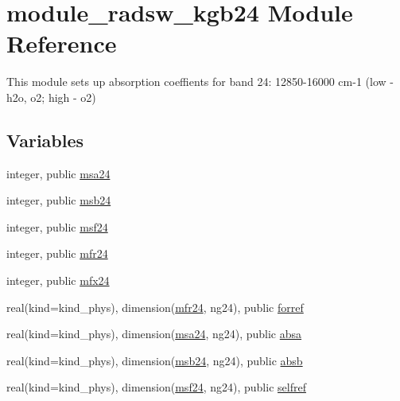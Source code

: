 \hypertarget{namespacemodule__radsw__kgb24}{}\section{module\+\_\+radsw\+\_\+kgb24 Module Reference}
\label{namespacemodule__radsw__kgb24}


This module sets up absorption coeffients for band 24\+: 12850-\/16000 cm-\/1 (low -\/ h2o, o2; high -\/ o2)  


\subsection*{Variables}
\begin{DoxyCompactItemize}
\item 
integer, public \hyperlink{namespacemodule__radsw__kgb24_ad416df05aed8a6ae1ecd57d5c90c223c}{msa24}
\item 
integer, public \hyperlink{namespacemodule__radsw__kgb24_a0ec09b4df9fbfa868844ad93a84cbe31}{msb24}
\item 
integer, public \hyperlink{namespacemodule__radsw__kgb24_a52d0fde0af1d5427acf0d1924f393cdc}{msf24}
\item 
integer, public \hyperlink{namespacemodule__radsw__kgb24_a3a1c3808493ce89f2218116a02350e51}{mfr24}
\item 
integer, public \hyperlink{namespacemodule__radsw__kgb24_a6fcafb0e1605ad49a252ed1e22b00a5b}{mfx24}
\item 
real(kind=kind\+\_\+phys), dimension(\hyperlink{namespacemodule__radsw__kgb24_a3a1c3808493ce89f2218116a02350e51}{mfr24}, ng24), public \hyperlink{namespacemodule__radsw__kgb24_ac57357ab300edcbad8f7b3801b796af3}{forref}
\item 
real(kind=kind\+\_\+phys), dimension(\hyperlink{namespacemodule__radsw__kgb24_ad416df05aed8a6ae1ecd57d5c90c223c}{msa24}, ng24), public \hyperlink{namespacemodule__radsw__kgb24_a06965ec156c4e1d18d50a70ba43bd8e1}{absa}
\item 
real(kind=kind\+\_\+phys), dimension(\hyperlink{namespacemodule__radsw__kgb24_a0ec09b4df9fbfa868844ad93a84cbe31}{msb24}, ng24), public \hyperlink{namespacemodule__radsw__kgb24_abd4db3c9678fee17f2cfd4a3e290619a}{absb}
\item 
real(kind=kind\+\_\+phys), dimension(\hyperlink{namespacemodule__radsw__kgb24_a52d0fde0af1d5427acf0d1924f393cdc}{msf24}, ng24), public \hyperlink{namespacemodule__radsw__kgb24_a784e78b5964fadd3e3e1f57f7af30802}{selfref}

\end{DoxyCompactItemize}
